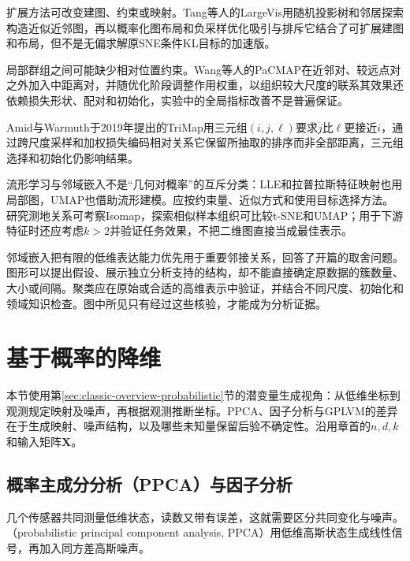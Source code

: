 扩展方法可改变建图、约束或映射。Tang等人的LargeVis用随机投影树和邻居探索构造近似近邻图，再以概率化图布局和负采样优化吸引与排斥它结合了可扩展建图和布局，但不是无偏求解原SNE条件KL目标的加速版。

局部群组之间可能缺少相对位置约束。Wang等人的PaCMAP在近邻对、较远点对之外加入中距离对，并随优化阶段调整作用权重，以组织较大尺度的联系其效果还依赖损失形状、配对和初始化，实验中的全局指标改善不是普遍保证。

Amid与Warmuth于2019年提出的TriMap用三元组$(i,j,\ell)$要求$j$比$\ell$更接近$i$，通过跨尺度采样和加权损失编码相对关系它保留所抽取的排序而非全部距离，三元组选择和初始化仍影响结果。

流形学习与邻域嵌入不是“几何对概率”的互斥分类：LLE和拉普拉斯特征映射也用局部图，UMAP也借助流形建模。应按约束量、近似方式和使用目标选择方法。研究测地关系可考察Isomap，探索相似样本组织可比较t-SNE和UMAP；用于下游特征时还应考虑$k>2$并验证任务效果，不把二维图直接当成最佳表示。

邻域嵌入把有限的低维表达能力优先用于重要邻接关系，回答了开篇的取舍问题。图形可以提出假设、展示独立分析支持的结构，却不能直接确定原数据的簇数量、大小或间隔。聚类应在原始或合适的高维表示中验证，并结合不同尺度、初始化和领域知识检查。图中所见只有经过这些核验，才能成为分析证据。

\section{基于概率的降维}
\label{sec:dim-probabilistic}

本节使用第\ref{sec:classic-overview-probabilistic}节的潜变量生成视角：从低维坐标到观测规定映射及噪声，再根据观测推断坐标。PPCA、因子分析与GPLVM的差异在于生成映射、噪声结构，以及哪些未知量保留后验不确定性。沿用章首的$n,d,k$和输入矩阵$\bm{X}$。

\subsection{概率主成分分析（PPCA）与因子分析}
\label{sec:dim-ppca}

几个传感器共同测量低维状态，读数又带有误差，这就需要区分共同变化与噪声。（probabilistic principal component analysis, PPCA）用低维高斯状态生成线性信号，再加入同方差高斯噪声。

